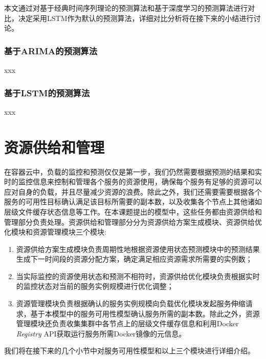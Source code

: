 本文通过对基于经典时间序列理论的预测算法和基于深度学习的预测算法进行对比，决定采用LSTM作为默认的预测算法，详细对比分析将在接下来的小结进行讨论。

\subsubsection{基于ARIMA的预测算法}
xxx

\subsubsection{基于LSTM的预测算法}
xxx

\section{资源供给和管理}
在容器云中，负载的监控和预测仅仅是第一步，我们仍然需要根据预测的结果和实时的监控信息来控制和管理各个服务的资源使用，确保每个服务有足够的资源可以应对自身的负载，并且尽量减少资源的浪费。除此之外，我们还需要需要根据各个服务的可用性目标确认满足该目标所需要的副本数，以及收集各个节点上其他诸如层级文件缓存状态信息等工作。在本课题提出的模型中，这些任务都由资源供给和管理部分负责处理。资源供给和管理部分分为资源供给方案生成模块、资源供给优化模块和资源管理模块三个模块:
\begin{enumerate}
\item 资源供给方案生成模块负责周期性地根据资源使用状态预测模块中的预测结果生成下一时间段的资源分配方案，确定满足相应资源需求所需要的实例数；
\item 当实际监控的资源使用状态和预测不相符时，资源供给优化模块负责根据实时的监控状态对当前的服务实例规模进行优化调整；
\item 资源管理模块负责根据确认的服务实例规模向负载优化模块发起服务伸缩请求，基于本模型中的服务可用性模型确认服务所需的副本数。除此之外，资源管理模块还负责收集集群中各节点上的层级文件缓存信息和利用Docker \emph{Registry} API获取运行服务所需Docker镜像的元信息。
\end{enumerate}
我们将在接下来的几个小节中对服务可用性模型和以上三个模块进行详细介绍。

